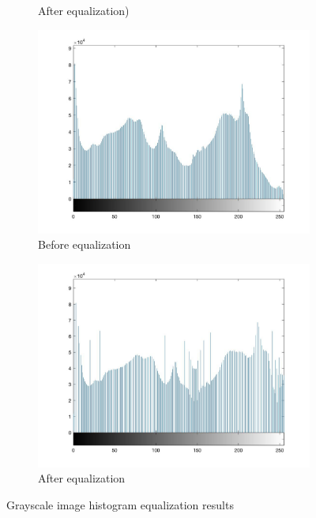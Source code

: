 \documentclass[conference]{IEEEtran}
\begin{document}
\begin{figure}[h!]
\begin{subfigure}[b]{0.4\linewidth}
\caption{After equalization)}
\end{subfigure}
\begin{subfigure}[b]{0.4\linewidth}
\includegraphics[width=\linewidth]{images/img15.jpg}
\caption{Before equalization}
\end{subfigure}
\begin{subfigure}[b]{0.4\linewidth}
\includegraphics[width=\linewidth]{images/img16.jpg}
\caption{After equalization}
\end{subfigure}
\caption{Grayscale image histogram equalization results}
\label{fig:Grayscale image histogram equalization results}
\end{figure}
\end{document}
